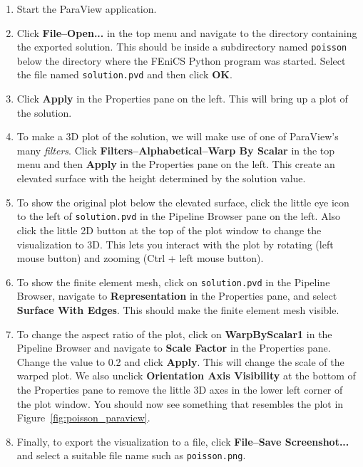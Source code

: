 \documentclass[graybox,envcountchap,sectrefs,final]{svmonodo}
\begin{document}
\begin{enumerate}
\item Start the ParaView application.

\item Click \textbf{File--Open...} in the top menu and navigate to the directory containing the exported solution. This should be inside a subdirectory named \texttt{poisson} below the directory where the FEniCS Python program was started. Select the file named \texttt{solution.pvd} and then click \textbf{OK}.

\item Click \textbf{Apply} in the Properties pane on the left. This will bring up a plot of the solution.

\item To make a 3D plot of the solution, we will make use of one of ParaView's many \emph{filters}. Click \textbf{Filters--Alphabetical--Warp By Scalar} in the top menu and then \textbf{Apply} in the Properties pane on the left. This create an elevated surface with the height determined by the solution value.

\item To show the original plot below the elevated surface, click the little eye icon to the left of \texttt{solution.pvd} in the Pipeline Browser pane on the left. Also click the little 2D button at the top of the plot window to change the visualization to 3D. This lets you interact with the plot by rotating (left mouse button) and zooming (Ctrl + left mouse button).

\item To show the finite element mesh, click on \texttt{solution.pvd} in the Pipeline Browser, navigate to \textbf{Representation} in the Properties pane, and select \textbf{Surface With Edges}. This should make the finite element mesh visible.

\item To change the aspect ratio of the plot, click on \textbf{WarpByScalar1} in the Pipeline Browser and navigate to \textbf{Scale Factor} in the Properties pane. Change the value to 0.2 and click \textbf{Apply}. This will change the scale of the warped plot. We also unclick \textbf{Orientation Axis Visibility} at the bottom of the Properties pane to remove the little 3D axes in the lower left corner of the plot window. You should now see something that resembles the plot in Figure~\ref{fig:poisson_paraview}.

\item Finally, to export the visualization to a file, click \textbf{File--Save Screenshot...} and select a suitable file name such as \texttt{poisson.png}.
\end{enumerate}
\end{document}
